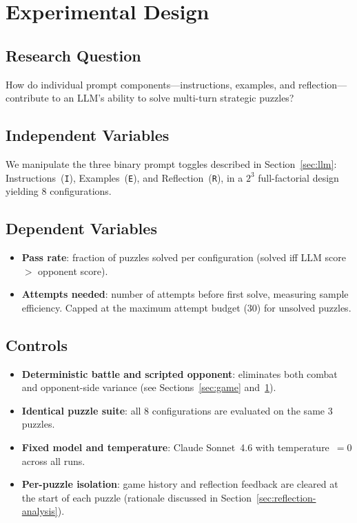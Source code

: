\documentclass[11pt]{article}
\begin{document}
\section{Experimental Design}\label{sec:experiment}

\subsection{Research Question}

How do individual prompt components---instructions, examples, and reflection---contribute to an LLM's ability to solve multi-turn strategic puzzles?

\subsection{Independent Variables}

We manipulate the three binary prompt toggles described in Section~\ref{sec:llm}: Instructions~(\texttt{I}), Examples~(\texttt{E}), and Reflection~(\texttt{R}), in a $2^3$ full-factorial design yielding 8 configurations.

\subsection{Dependent Variables}

\begin{itemize}[nosep]
    \item \textbf{Pass rate}: fraction of puzzles solved per configuration (solved iff LLM score $>$ opponent score).
    \item \textbf{Attempts needed}: number of attempts before first solve, measuring sample efficiency. Capped at the maximum attempt budget (30) for unsolved puzzles.
\end{itemize}

\subsection{Controls}

\begin{itemize}[nosep]
    \item \textbf{Deterministic battle and scripted opponent}: eliminates both combat and opponent-side variance (see Sections~\ref{sec:game} and~\ref{sec:experiment}).
    \item \textbf{Identical puzzle suite}: all 8 configurations are evaluated on the same 3 puzzles.
    \item \textbf{Fixed model and temperature}: Claude Sonnet~4.6 with temperature~$= 0$ across all runs.
    \item \textbf{Per-puzzle isolation}: game history and reflection feedback are cleared at the start of each puzzle (rationale discussed in Section~\ref{sec:reflection-analysis}).
\end{itemize}
\end{document}
